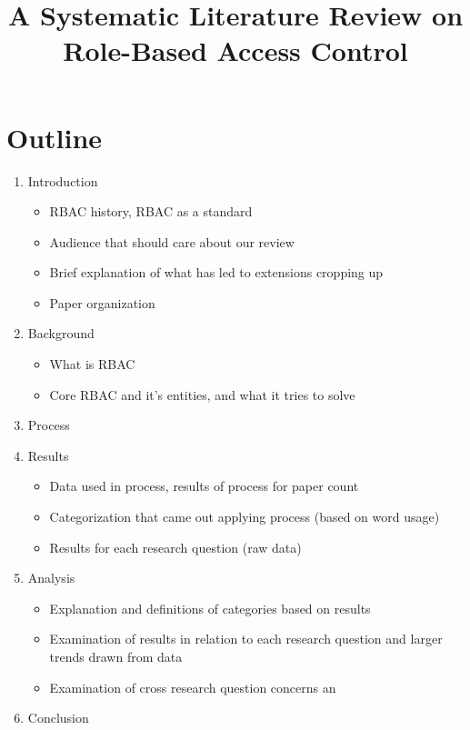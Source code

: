 \documentclass[3p,12pt]{elsarticle}
\begin{document}
\begin{frontmatter}

\title{A Systematic Literature Review on Role-Based Access Control}

\author{}

\address{}



\begin{keyword}
\end{keyword}

\end{frontmatter}

\section{Outline}

\begin{enumerate}
\item Introduction
    \begin{itemize}
  	\item RBAC history, RBAC as a standard
  	\item Audience that should care about our review
  	\item Brief explanation of what has led to extensions cropping up
  	\item Paper organization
    \end{itemize}
\item Background
    \begin{itemize}
   	\item What is RBAC
   	\item Core RBAC and it's entities, and what it tries to solve
    \end{itemize}
\item Process
\item Results
    \begin{itemize}
  	\item Data used in process, results of process for paper count
  	\item Categorization that came out applying process (based on word usage)
  	\item Results for each research question (raw data)
    \end{itemize}
\item Analysis
    \begin{itemize}
  	\item Explanation and definitions of categories based on results
  	\item Examination of results in relation to each research question and larger trends drawn from data
  	\item Examination of cross research question concerns an
    \end{itemize}
\item Conclusion
\end{enumerate}











\end{document}
